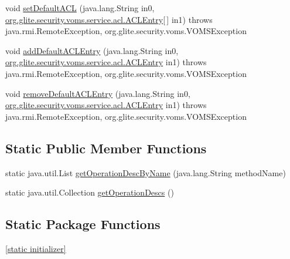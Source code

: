 \begin{DoxyCompactItemize}
\item 
void \hyperlink{classorg_1_1glite_1_1security_1_1voms_1_1service_1_1acl_1_1VOMSACLSoapBindingSkeleton_ad7704f9b67a6fff3cc01fd61d615a668}{setDefaultACL} (java.lang.String in0, \hyperlink{classorg_1_1glite_1_1security_1_1voms_1_1service_1_1acl_1_1ACLEntry}{org.glite.security.voms.service.acl.ACLEntry}\mbox{[}$\,$\mbox{]} in1)  throws java.rmi.RemoteException, org.glite.security.voms.VOMSException     
\item 
void \hyperlink{classorg_1_1glite_1_1security_1_1voms_1_1service_1_1acl_1_1VOMSACLSoapBindingSkeleton_a5f2c8cda7baae20f470cee51e6849c90}{addDefaultACLEntry} (java.lang.String in0, \hyperlink{classorg_1_1glite_1_1security_1_1voms_1_1service_1_1acl_1_1ACLEntry}{org.glite.security.voms.service.acl.ACLEntry} in1)  throws java.rmi.RemoteException, org.glite.security.voms.VOMSException     
\item 
void \hyperlink{classorg_1_1glite_1_1security_1_1voms_1_1service_1_1acl_1_1VOMSACLSoapBindingSkeleton_a160b00b4526b13871bc6e3a75b527434}{removeDefaultACLEntry} (java.lang.String in0, \hyperlink{classorg_1_1glite_1_1security_1_1voms_1_1service_1_1acl_1_1ACLEntry}{org.glite.security.voms.service.acl.ACLEntry} in1)  throws java.rmi.RemoteException, org.glite.security.voms.VOMSException     
\end{DoxyCompactItemize}
\subsection*{Static Public Member Functions}
\begin{DoxyCompactItemize}
\item 
static java.util.List \hyperlink{classorg_1_1glite_1_1security_1_1voms_1_1service_1_1acl_1_1VOMSACLSoapBindingSkeleton_a41dd28abde047584e9a9f16371663e31}{getOperationDescByName} (java.lang.String methodName)
\item 
static java.util.Collection \hyperlink{classorg_1_1glite_1_1security_1_1voms_1_1service_1_1acl_1_1VOMSACLSoapBindingSkeleton_a91f72f17cbf963471f61ebdbec570966}{getOperationDescs} ()
\end{DoxyCompactItemize}
\subsection*{Static Package Functions}
\begin{DoxyCompactItemize}
\item 
\hyperlink{classorg_1_1glite_1_1security_1_1voms_1_1service_1_1acl_1_1VOMSACLSoapBindingSkeleton_ad0feeb4e4058d9d18fc5b2925a471a59}{\mbox{[}static initializer\mbox{]}}
\end{DoxyCompactItemize}
